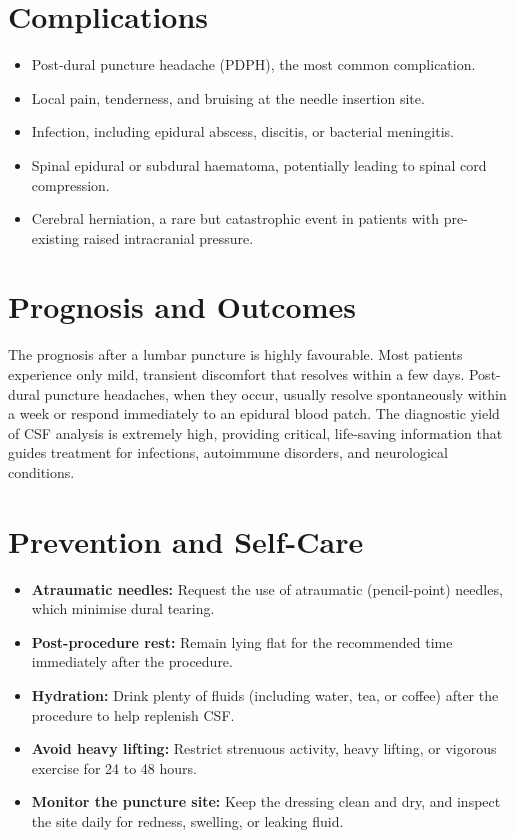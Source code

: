 \section*{Complications}
\begin{itemize}
    \item Post-dural puncture headache (PDPH), the most common complication.
    \item Local pain, tenderness, and bruising at the needle insertion site.
    \item Infection, including epidural abscess, discitis, or bacterial meningitis.
    \item Spinal epidural or subdural haematoma, potentially leading to spinal cord compression.
    \item Cerebral herniation, a rare but catastrophic event in patients with pre-existing raised intracranial pressure.
\end{itemize}

\section*{Prognosis and Outcomes}
The prognosis after a lumbar puncture is highly favourable. Most patients experience only mild, transient discomfort that resolves within a few days. Post-dural puncture headaches, when they occur, usually resolve spontaneously within a week or respond immediately to an epidural blood patch. The diagnostic yield of CSF analysis is extremely high, providing critical, life-saving information that guides treatment for infections, autoimmune disorders, and neurological conditions.

\section*{Prevention and Self-Care}
\begin{itemize}
    \item \textbf{Atraumatic needles:} Request the use of atraumatic (pencil-point) needles, which minimise dural tearing.
    \item \textbf{Post-procedure rest:} Remain lying flat for the recommended time immediately after the procedure.
    \item \textbf{Hydration:} Drink plenty of fluids (including water, tea, or coffee) after the procedure to help replenish CSF.
    \item \textbf{Avoid heavy lifting:} Restrict strenuous activity, heavy lifting, or vigorous exercise for 24 to 48 hours.
    \item \textbf{Monitor the puncture site:} Keep the dressing clean and dry, and inspect the site daily for redness, swelling, or leaking fluid.
\end{itemize}

